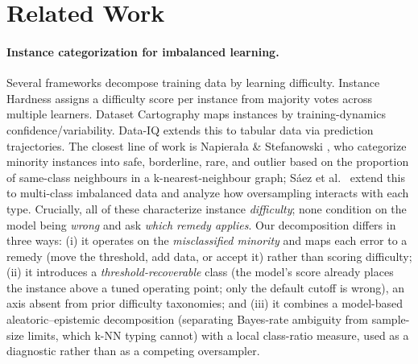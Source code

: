 \section{Related Work}\label{sec:related}

\paragraph{Instance categorization for imbalanced learning.}
Several frameworks decompose training data by learning difficulty.
Instance Hardness \cite{smith2014instance} assigns a difficulty score per
instance from majority votes across multiple learners. Dataset Cartography
\cite{swayamdipta2020dataset} maps instances by training-dynamics
confidence/variability. Data-IQ \cite{seedat2022dataiq} extends this to
tabular data via prediction trajectories. The closest line of work is
Napiera{\l}a \& Stefanowski \cite{napierala2010learning,napierala2016types},
who categorize minority instances into safe, borderline, rare, and outlier
based on the proportion of same-class neighbours in a k-nearest-neighbour
graph; S\'aez et al.\ \cite{saez2016analyzing} extend this to multi-class
imbalanced data and analyze how oversampling interacts with each type. Crucially,
all of these characterize instance \emph{difficulty}; none condition on the model
being \emph{wrong} and ask \emph{which remedy applies}. Our decomposition differs
in three ways: (i) it operates on the \emph{misclassified minority} and maps each
error to a remedy (move the threshold, add data, or accept it) rather than
scoring difficulty; (ii) it introduces a \emph{threshold-recoverable} class (the
model's score already places the instance above a tuned operating point; only the
default cutoff is wrong), an axis absent from prior difficulty taxonomies; and (iii) it combines a
model-based aleatoric--epistemic decomposition (separating Bayes-rate ambiguity
from sample-size limits, which k-NN typing cannot) with a local class-ratio
measure, used as a diagnostic rather than as a competing oversampler.

